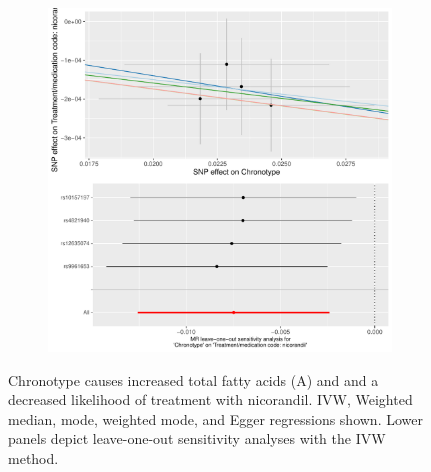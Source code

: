 \documentclass[journal,article,submit,moreauthors,pdftex]{Definitions/mdpi}
\begin{document}
\begin{figure}[htbp]
\begin{subfigure}[b]{0.4\textwidth}
         \includegraphics[width=\textwidth]{Figs/Analysis2/Chronotype_vs_Treatment_medication_code:_nicorandil.Plots.pdf}
         \caption{}
         \label{nicorandil}
     \end{subfigure}
        \caption{Chronotype causes increased total fatty acids (A) and and a decreased likelihood of treatment with nicorandil. IVW, Weighted median, mode, weighted mode, and Egger regressions shown. Lower panels depict leave-one-out sensitivity analyses with the IVW method.}
        \label{fffanicorandil}
\end{figure}
\end{document}
